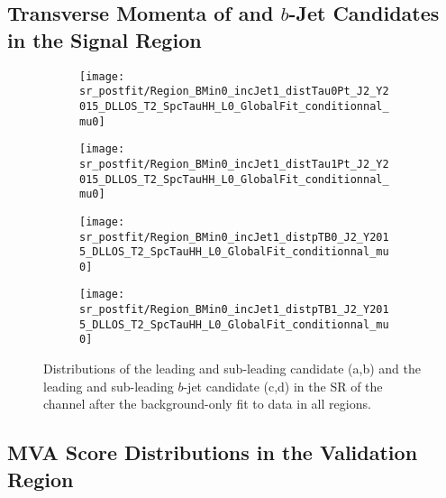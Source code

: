 \subsection*{Transverse Momenta of \tauhadvis and $b$-Jet Candidates in the
  Signal Region}

\begin{figure}[htbp]
  \centering

  \begin{subfigure}{0.495\textwidth}
    \centering

    \texttt{[image: sr\_postfit/Region\_BMin0\_incJet1\_distTau0Pt\_J2\_Y2015\_DLLOS\_T2\_SpcTauHH\_L0\_GlobalFit\_conditionnal\_mu0]}
    \subcaption{}
  \end{subfigure}\hfill%
  \begin{subfigure}{0.495\textwidth}
    \centering

    \texttt{[image: sr\_postfit/Region\_BMin0\_incJet1\_distTau1Pt\_J2\_Y2015\_DLLOS\_T2\_SpcTauHH\_L0\_GlobalFit\_conditionnal\_mu0]}
    \subcaption{}
  \end{subfigure}

  \begin{subfigure}{0.495\textwidth}
    \centering

    \texttt{[image: sr\_postfit/Region\_BMin0\_incJet1\_distpTB0\_J2\_Y2015\_DLLOS\_T2\_SpcTauHH\_L0\_GlobalFit\_conditionnal\_mu0]}
    \subcaption{}
  \end{subfigure}\hfill%
  \begin{subfigure}{0.495\textwidth}
    \centering

    \texttt{[image: sr\_postfit/Region\_BMin0\_incJet1\_distpTB1\_J2\_Y2015\_DLLOS\_T2\_SpcTauHH\_L0\_GlobalFit\_conditionnal\_mu0]}
    \subcaption{}
  \end{subfigure}

  \caption[Distributions of the leading and sub-leading \tauhadvis candidate \pT
  and the leading and sub-leading $b$-jet candidate \pT in the SR of the \hadhad
  channel]{Distributions of the leading and sub-leading \tauhadvis candidate
    \pT (a,b) and the leading and sub-leading $b$-jet candidate \pT (c,d) in the
    SR of the \hadhad channel after the background-only fit to data in all
    regions.}
\end{figure}


\clearpage
\subsection*{MVA Score Distributions in the \ZJets Validation Region}

